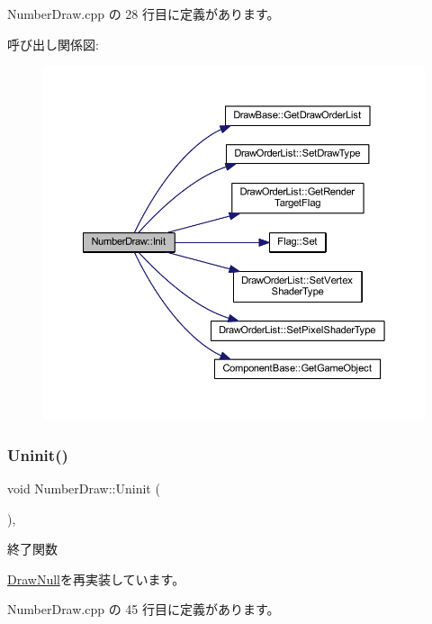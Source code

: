  Number\+Draw.\+cpp の 28 行目に定義があります。

呼び出し関係図\+:\nopagebreak
\begin{figure}[H]
\begin{center}
\leavevmode
\includegraphics[width=350pt]{class_number_draw_ad52c1e8b9ae6e830a82c440cc18cb6c9_cgraph}
\end{center}
\end{figure}
\mbox{\label{class_number_draw_a2b203d101f23f0d3f584937ff5ad662a}} 
\subsubsection{\texorpdfstring{Uninit()}{Uninit()}}
{\footnotesize\ttfamily void Number\+Draw\+::\+Uninit (\begin{DoxyParamCaption}{ }\end{DoxyParamCaption})\hspace{0.3cm}{\ttfamily [override]}, {\ttfamily [virtual]}}



終了関数 



\mbox{\hyperlink{class_draw_null_a12d44e341c7364b5ab9cdd661dc16187}{Draw\+Null}}を再実装しています。



 Number\+Draw.\+cpp の 45 行目に定義があります。



